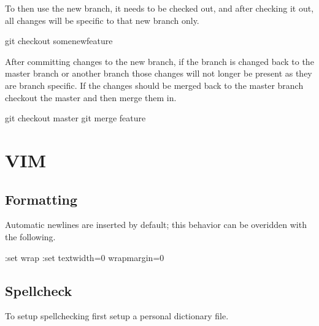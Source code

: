 \documentclass[]{book}
\newenvironment{Shaded}{\begin{snugshade}}{\end{snugshade}}
\newcommand{\ExtensionTok}[1]{#1}
\newcommand{\FunctionTok}[1]{\textcolor[rgb]{0.00,0.00,0.00}{#1}}
\newcommand{\NormalTok}[1]{#1}
\begin{document}
To then use the new branch, it needs to be checked out, and after checking it out, all changes will be specific to that new branch only.

\begin{Shaded}
\begin{Highlighting}[]
\FunctionTok{git}\NormalTok{ checkout somenewfeature}
\end{Highlighting}
\end{Shaded}

After committing changes to the new branch, if the branch is changed back to the master branch or another branch those changes will not longer be present as they are branch specific. If the changes should be merged back to the master branch checkout the master and then merge them in.

\begin{Shaded}
\begin{Highlighting}[]
\FunctionTok{git}\NormalTok{ checkout master}
\FunctionTok{git}\NormalTok{ merge feature}
\end{Highlighting}
\end{Shaded}

\hypertarget{vim}{%
\chapter{VIM}\label{vim}}

\hypertarget{formatting}{%
\section{Formatting}\label{formatting}}

Automatic newlines are inserted by default; this behavior can be overidden with the following.

\begin{Shaded}
\begin{Highlighting}[]
\NormalTok{:}\ExtensionTok{set}\NormalTok{ wrap}
\NormalTok{:}\ExtensionTok{set}\NormalTok{ textwidth=0 wrapmargin=0}
\end{Highlighting}
\end{Shaded}

\hypertarget{spellcheck}{%
\section{Spellcheck}\label{spellcheck}}

To setup spellchecking first setup a personal dictionary file.
\end{document}
